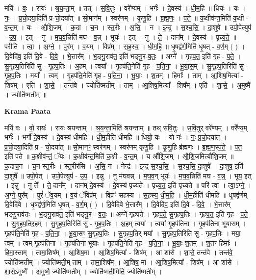 \documentclass[17pt]{extarticle}
\begin{document}
मयि॑ । वः॒ । रायः॑ । श्र॒य॒न्ता॒म् ॥ तत् । स॒वि॒तुः । वरे᳚ण्यम् । भर्गः॑ । दे॒वस्य॑ । धी॒म॒हि॒ ॥ धियः॑ । यः । नः॒ । प्र॒चो॒दया॒दिति॑ प्र-चो॒दया᳚त् ॥ सो॒मान᳚म् । स्वर॑णम् । कृ॒णु॒हि । ब्र॒ह्म॒णः॒ । प॒ते॒ ॥ क॒क्षीव॑न्त॒मिति॑ क॒क्षी - व॒न्त॒म् । यः । औ॒शि॒जम् । क॒दा । च॒न । स्त॒रीः । अ॒सि॒ । न । इ॒न्द्र॒ । स॒श्च॒सि॒ । दा॒शुषे᳚ ॥ उपो॒पेत्युप॑ - उ॒प॒ । इत् । नु । म॒घ॒व॒न्निति॑ मघ - व॒न्न् । भूयः॑ । इत् । नु । ते॒ । दान᳚म् । दे॒वस्य॑ । पृ॒च्य॒ते॒ ॥ परीति॑ । त्वा॒ । अ॒ग्ने॒ । पुर᳚म् । व॒यम् । विप्र᳚म् । स॒ह॒स्य॒ । धी॒म॒हि॒ ॥ धृ॒षद्व॑र्ण॒मिति॑ धृ॒षत् - व॒र्ण॒म् ( ) । दि॒वेदि॑व॒ इति॑ दि॒वे - दि॒वे॒ । भे॒त्तार᳚म् । भ॒ङ्गु॒राव॑त॒ इति॑ भङ्गु॒र-व॒तः॒ ॥ अग्ने᳚ । गृ॒ह॒प॒त॒ इति॑ गृह - प॒ते॒ । सु॒गृ॒ह॒प॒तिरिति॑ सु - गृ॒ह॒प॒तिः । अ॒हम् । त्वया᳚ । गृ॒हप॑ति॒नेति॑ गृ॒ह - प॒ति॒ना॒ । भू॒या॒स॒म् । सु॒गृ॒ह॒प॒तिरिति॑ सु - गृ॒ह॒प॒तिः । मया᳚ । त्वम् । गृ॒हप॑ति॒नेति॑ गृ॒ह - प॒ति॒ना॒ । भू॒याः॒ । श॒तम् । हिमाः᳚ । ताम् । आ॒शिष॒मित्या᳚ - शिष᳚म् । एति॑ । शा॒से॒ । तन्त॑वे । ज्योति॑ष्मतीम् । ताम् । आ॒शिष॒मित्या᳚ - शिष᳚म् । एति॑ । शा॒से॒ । अ॒मुष्मै᳚ । ज्योति॑ष्मतीम् ॥  \newline


\textbf{Krama Paata} \newline

मयि॑ वः । वो॒ रायः॑ । रायः॑ श्रयन्ताम् । श्र॒य॒न्ता॒मिति॑ श्रयन्ताम् ॥ तथ् स॑वि॒तुः । स॒वि॒तुर् वरे᳚ण्यम् । वरे᳚ण्य॒म् भर्गः॑ । भर्गो॑ दे॒वस्य॑ । दे॒वस्य॑ धीमहि । धी॒म॒हीति॑ धीमहि ॥ धियो॒ यः । यो नः॑ । नः॒ प्र॒चो॒दया᳚त् । प्र॒चो॒दया॒दिति॑ प्र - चो॒दया᳚त् ॥ सो॒मानꣳ॒॒ स्वर॑णम् । स्वर॑णम् कृणु॒हि । कृ॒णु॒हि ब्र॑ह्मणः । ब्र॒ह्म॒ण॒स्प॒ते॒ । प॒त॒ इति॑ पते ॥ क॒क्षीव॑न्तं॒ ॅयः । क॒क्षीव॑न्त॒मिति॑ क॒क्षी - व॒न्त॒म् । य औ॑शि॒जम् । औ॒शि॒जमित्यौ॑शि॒जम् ॥ क॒दाच॒न । च॒न स्त॒रीः । स्त॒रीर॑सि । अ॒सि॒ न । नेन्द्र॑ । इ॒न्द्र॒ स॒श्च॒सि॒ । स॒श्च॒सि॒ दा॒शुषे᳚ । 
दा॒शुष॒ इति॑ दा॒शुषे᳚ ॥ उपो॒पेत् । उपो॒पेत्युप॑ - उ॒प॒ । इन्नु । नु म॑घवन्न् । म॒घ॒व॒न् भूयः॑ । म॒घ॒व॒न्निति॑ मघ - व॒न्न्॒ । भूय॒ इत् । इन्नु । नु ते᳚ । ते॒ दान᳚म् । दान॑म् दे॒वस्य॑ । दे॒वस्य॑ पृच्यते । पृ॒च्य॒त॒ इति॑ पृच्यते ॥ परि॑ त्वा । त्वा॒ऽग्ने॒ । अ॒ग्ने॒ पुर᳚म् । पुरं॑ ॅव॒यम् । व॒यं ॅविप्र᳚म् । विप्रꣳ॑ सहस्य । स॒ह॒स्य॒ धी॒म॒हि॒ । धी॒म॒हीति॑ धीमहि ॥ धृ॒षद्व॑र्णम् दि॒वेदि॑वे । धृ॒षद्व॑र्ण॒मिति॑ धृ॒षत् - व॒र्ण॒म् ( ) । दि॒वेदि॑वे भे॒त्तार᳚म् । दि॒वेदि॑व॒ इति॑ दि॒वे - दि॒वे॒ । भे॒त्तार॑म् भङ्गु॒राव॑तः । भ॒ङ्गु॒राव॑त॒ इति॑ भङ्गु॒र - व॒तः॒ ॥ अग्ने॑ गृहपते । गृ॒ह॒प॒ते॒ सु॒गृ॒ह॒प॒तिः । गृ॒ह॒प॒त॒ इति॑ गृह - प॒ते॒ । सु॒गृ॒ह॒प॒तिर॒हम् । सु॒गृ॒ह॒प॒तिरिति॑ सु - गृ॒ह॒प॒तिः । अ॒हम् त्वया᳚ । त्वया॑ गृ॒हप॑तिना । गृ॒हप॑तिना भूयासम् । गृ॒हप॑ति॒नेति॑ गृ॒ह - प॒ति॒ना॒ । भू॒या॒सꣳ॒॒ सु॒गृ॒ह॒प॒तिः । सु॒गृ॒ह॒प॒तिर् मया᳚ । सु॒गृ॒ह॒प॒तिरिति॑ सु - गृ॒ह॒प॒तिः । मया॒ त्वम् । त्वम् गृ॒हप॑तिना । गृ॒हप॑तिना भूयाः । गृ॒हप॑ति॒नेति॑ गृ॒ह - प॒ति॒ना॒ । भू॒याः॒ श॒तम् । श॒तꣳ हिमाः᳚ । हिमा॒स्ताम् । तामा॒शिष᳚म् । आ॒शिष॒मा । आ॒शिष॒मित्या᳚ - शिष᳚म् । आ शा॑से । शा॒से॒ तन्त॑वे । तन्त॑वे॒ ज्योति॑ष्मतीम् । ज्योति॑ष्मती॒म् ताम् । तामा॒शिष᳚म् । आ॒शिष॒ मा । आ॒शिष॒मित्या᳚ - शिष᳚म् । आ शा॑से । शा॒से॒ऽमुष्मै᳚ । अ॒मुष्मै॒ ज्योति॑ष्मतीम् । 
ज्योति॑ष्मती॒मिति॒ ज्योति॑ष्मतीम् । \newline
\end{document}
